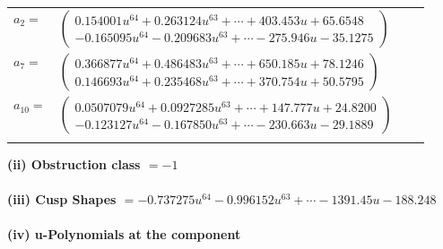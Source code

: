 \documentclass[1p]{elsarticle_modified}
\theoremstyle{definition}
\begin{document}
\begin{tabular}{m{7pt} m{180pt} m{7pt} m{180pt} }
\flushright $a_{2}=$&$\begin{pmatrix}0.154001 u^{64}+0.263124 u^{63}+\cdots+403.453 u+65.6548\\-0.165095 u^{64}-0.209683 u^{63}+\cdots-275.946 u-35.1275\end{pmatrix}$ \\
\flushright $a_{7}=$&$\begin{pmatrix}0.366877 u^{64}+0.486483 u^{63}+\cdots+650.185 u+78.1246\\0.146693 u^{64}+0.235468 u^{63}+\cdots+370.754 u+50.5795\end{pmatrix}$ \\
\flushright $a_{10}=$&$\begin{pmatrix}0.0507079 u^{64}+0.0927285 u^{63}+\cdots+147.777 u+24.8200\\-0.123127 u^{64}-0.167850 u^{63}+\cdots-230.663 u-29.1889\end{pmatrix}$\\&\end{tabular}
\flushleft \textbf{(ii) Obstruction class $= -1$}\\~\\
\flushleft \textbf{(iii) Cusp Shapes $= -0.737275 u^{64}-0.996152 u^{63}+\cdots-1391.45 u-188.248$}\\~\\
\newpage\renewcommand{\arraystretch}{1}
\flushleft \textbf{(iv) u-Polynomials at the component}\newline \\
\end{document}
